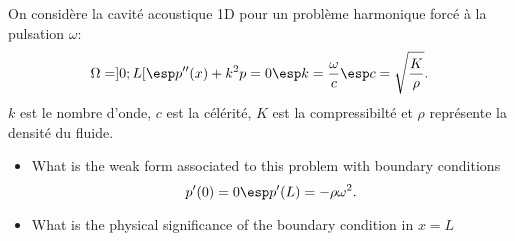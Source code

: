 \bexo

On considère la cavité acoustique  1D pour un problème harmonique forcé à la pulsation $\omega$:
\begin{equation}
\Omega=]0;L[\esp p''(x)+k^2 p=0\esp k=\dfrac{\omega}{c}\esp c=\sqrt{\dfrac{K}{\rho}}.
\end{equation}
$k$ est le nombre d'onde, $c$ est la célérité, $K$ est la compressibilté et $\rho$ représente la densité du fluide.

\begin{itemize}
	\item 
What is the weak form associated to this problem with boundary conditions
\begin{equation}
	 p'(0)=0 \esp p'(L)=-\rho\omega^2. 
\end{equation}

	\item What is the physical significance of the boundary condition in $x=L$
\end{itemize}
\eexo

